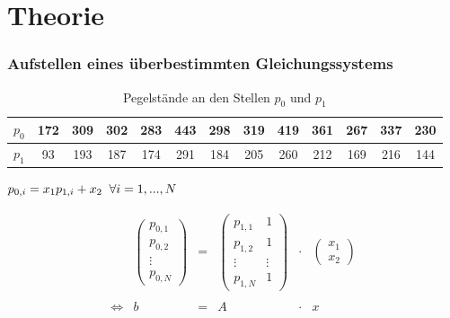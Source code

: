 \documentclass{beamer}
\begin{document}
\section{Theorie}
\begin{frame} %
  \frametitle{Aufstellen eines überbestimmten Gleichungssystems} %
  \tabcolsep=0.11cm
  \begin{table}
    \centering
  \begin{tabular}{c|cccccccccccc}
    $p_0$ & 172 & 309 & 302 & 283 & 443 & 298 & 319 & 419 & 361 & 267 & 337 & 230 \\ \hline
    $p_1$ & 93 & 193 & 187 & 174 & 291 & 184 & 205 & 260 & 212 & 169 & 216 & 144
  \end{tabular}
  \caption{Pegelstände an den Stellen $p_0$ und $p_1$}
\end{table}

\centering
$p_{0,i} = x_1 p_{1,i} + x_2 \thickspace \thickspace \forall i = 1,...,N$
\pause

\begin{equation*}
\begin{array}{cccccc}
&\begin{pmatrix}
  p_{0,1}\\
  p_{0,2}\\
  \vdots \\
  p_{0,N}
\end{pmatrix}
  &=&
\begin{pmatrix}
  p_{1,1} & 1\\
  p_{1,2} & 1\\
  \vdots & \vdots\\
  p_{1,N} & 1
 \end{pmatrix}
  &\cdot&
  \begin{pmatrix}
    x_1\\
    x_2
  \end{pmatrix}\\
  \\
  \iff&b &=& A &\cdot &x
\end{array}
\end{equation*}
\end{frame}
\end{document}
